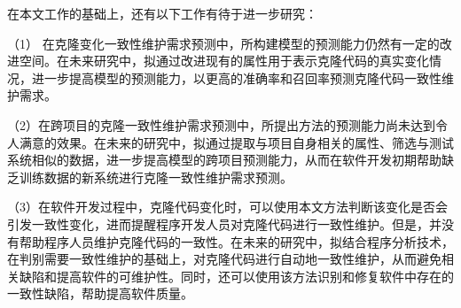 在本文工作的基础上，还有以下工作有待于进一步研究：

（1） 在克隆变化一致性维护需求预测中，所构建模型的预测能力仍然有一定的改进空间。在未来研究中，拟通过改进现有的属性用于表示克隆代码的真实变化情况，进一步提高模型的预测能力，以更高的准确率和召回率预测克隆代码一致性维护需求。

（2）在跨项目的克隆一致性维护需求预测中，所提出方法的预测能力尚未达到令人满意的效果。在未来的研究中，拟通过提取与项目自身相关的属性、筛选与测试系统相似的数据，进一步提高模型的跨项目预测能力，从而在软件开发初期帮助缺乏训练数据的新系统进行克隆一致性维护需求预测。

（3）在软件开发过程中，克隆代码变化时，可以使用本文方法判断该变化是否会引发一致性变化，进而提醒程序开发人员对克隆代码进行一致性维护。但是，并没有帮助程序人员维护克隆代码的一致性。在未来的研究中，拟结合程序分析技术，在判别需要一致性维护的基础上，对克隆代码进行自动地一致性维护，从而避免相关缺陷和提高软件的可维护性。同时，还可以使用该方法识别和修复软件中存在的一致性缺陷，帮助提高软件质量。